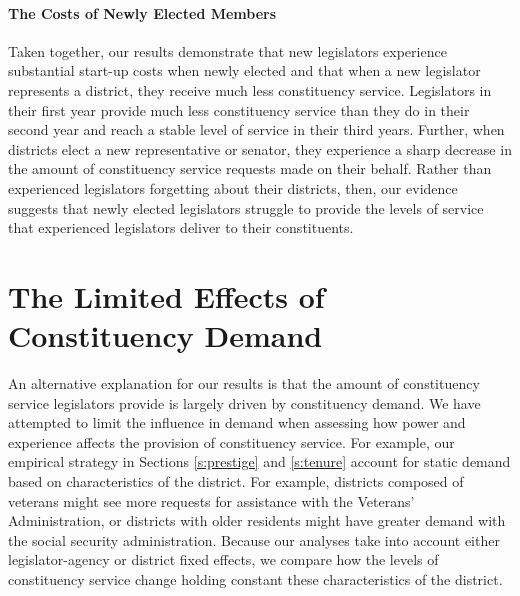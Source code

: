 \documentclass[12pt]{article}
\begin{document}
\paragraph{The Costs of Newly Elected Members} Taken together, our results demonstrate that new legislators experience substantial start-up costs when newly elected and that when a new legislator represents a district, they receive much less constituency service. Legislators in their first year provide much less constituency service than they do in their second year and reach a stable level of service in their third years. Further, when districts elect a new representative or senator, they experience a sharp decrease in the amount of constituency service requests made on their behalf. Rather than experienced legislators forgetting about their districts, then, our evidence suggests that newly elected legislators struggle to provide the levels of service that experienced legislators deliver to their constituents.  
 


\section{The Limited Effects of Constituency Demand}\label{s:demand} 

An alternative explanation for our results is that the amount of constituency service legislators provide is largely driven by constituency demand. We have attempted to limit the influence in demand when assessing how power and experience affects the provision of constituency service. For example, our empirical strategy in Sections \ref{s:prestige} and \ref{s:tenure} account for static demand based on characteristics of the district. For example, districts composed of veterans might see more requests for assistance with the Veterans' Administration, or districts with older residents might have greater demand with the social security administration. Because our analyses take into account either legislator-agency or district fixed effects, we compare how the levels of constituency service change holding constant these characteristics of the district.  
\end{document}
